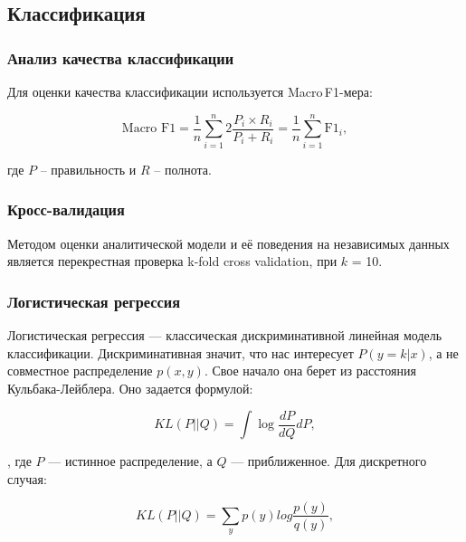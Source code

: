 \subsection{Классификация}


\subsubsection{Анализ качества классификации}

Для оценки качества классификации используется Macro\,F1-мера:

    \begin{equation*}
    \text{Macro F1} =  \frac{1}{n}\sum_{i=1}^n 2\frac{P_i\times R_i}{P_i + R_i} = \frac{1}{n}\sum_{i=1}^n
\text{F1}_i,
    \end{equation*}

    где $P$ -- правильность и $R$ -- полнота.


\subsubsection{Кросс-валидация}

Методом оценки аналитической модели и её поведения на независимых данных является перекрестная проверка k-fold cross validation, при $k$ = 10.


















\subsubsection{Логистическая регрессия}
\label{subsection:logreg}

Логистическая регрессия --- классическая дискриминативной линейная модель классификации. Дискриминативная
значит, что нас интересует $P (y = k | x)$, а не совместное распределение $p (x, y)$. Свое начало она берет из
расстояния Кульбака-Лейблера. Оно задается формулой:

\begin{equation}
 KL(P||Q) = \int\log\frac{dP}{dQ}dP,
\end{equation}

, где $P$ --- истинное распределение, а $Q$ --- приближенное. Для дискретного случая:

\begin{equation}
 KL(P||Q) = \sum_{y} p(y)log\frac{p(y)}{q(y)},
\end{equation}

